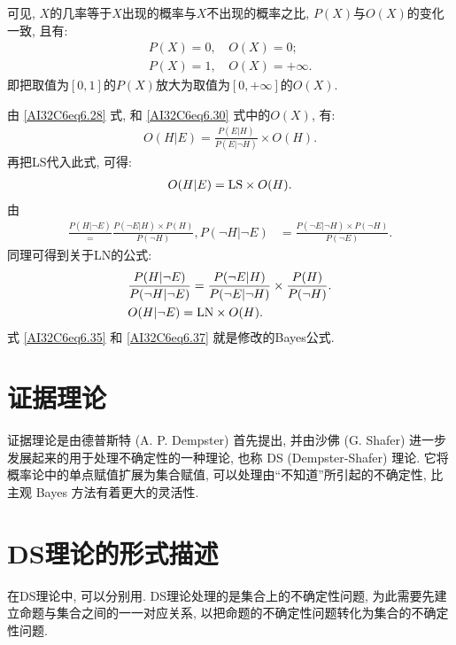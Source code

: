 可见, $X$的几率等于$X$出现的概率与$X$不出现的概率之比, $P(X)$与$O(X)$的变化一致, 且有:
\begin{align}
    P(X)=0,&\,O(X)=0;\\
    P(X)=1,&\,O(X)=+\infty.
\end{align}
即把取值为$[0,1]$的$P(X)$放大为取值为$[0,+\infty]$的$O(X)$.

由 \eqref{AI32C6eq6.28} 式, 和 \eqref{AI32C6eq6.30} 式中的$O(X)$, 有:
\begin{align}
    O(H | E)=\frac{P(E | H)}{P(E | \neg H)} \times O(H).
\end{align}
再把LS代入此式, 可得:
\begin{align}\label{AI32C6eq6.35}
    O(H | E)=\textup{LS} \times O(H).
\end{align}
由
\begin{align}
  \frac{P(H|\neg E)}=\frac{P(\neg E | H) \times P(H)}{P(\neg H)},  P(\neg H | \neg E) &=\frac{P(\neg E | \neg H) \times P(\neg H)}{P(\neg E)}.
\end{align}
同理可得到关于LN的公式:
\begin{align}
    &\frac{P(H|\neg E)}{P(\neg H|\neg E)}=\frac{P(\neg E | H)}{P(\neg E |\neg H)} \times \frac{P(H)}{P(\neg H)}.\label{AI32C6eq6.36} \\
    &O(H| \neg E)=\textup{LN} \times O(H). \label{AI32C6eq6.37}
\end{align}
式 \eqref{AI32C6eq6.35} 和 \eqref{AI32C6eq6.37} 就是修改的Bayes公式.
\section{证据理论}
证据理论是由德普斯特 (A. P. Dempster) 首先提出, 并由沙佛 (G. Shafer) 进一步发展起来的用于处理不确定性的一种理论, 也称 DS (Dempster-Shafer) 理论.
它将概率论中的单点赋值扩展为集合赋值, 可以处理由“不知道”所引起的不确定性, 比主观 Bayes 方法有着更大的灵活性.
\section{DS理论的形式描述}
    在DS理论中, 可以分别用.
DS理论处理的是集合上的不确定性问题, 为此需要先建立命题与集合之间的一一对应关系, 以把命题的不确定性问题转化为集合的不确定性问题. 

